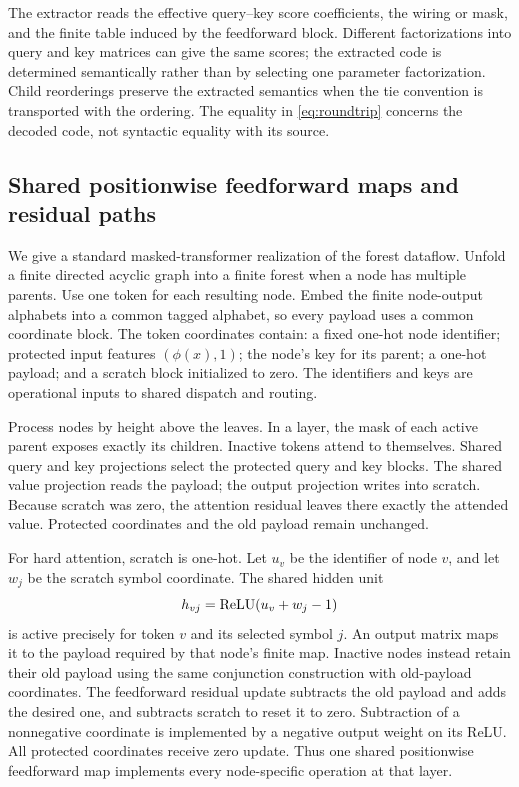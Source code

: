 The extractor reads the effective query--key score coefficients, the wiring or mask, and the finite table induced by the feedforward block. Different factorizations into query and key matrices can give the same scores; the extracted code is determined semantically rather than by selecting one parameter factorization. Child reorderings preserve the extracted semantics when the tie convention is transported with the ordering. The equality in \eqref{eq:roundtrip} concerns the decoded code, not syntactic equality with its source.

\subsection{Shared positionwise feedforward maps and residual paths}
We give a standard masked-transformer realization of the forest dataflow. Unfold a finite directed acyclic graph into a finite forest when a node has multiple parents. Use one token for each resulting node. Embed the finite node-output alphabets into a common tagged alphabet, so every payload uses a common coordinate block. The token coordinates contain: a fixed one-hot node identifier; protected input features $(\phi(x),1)$; the node's key for its parent; a one-hot payload; and a scratch block initialized to zero. The identifiers and keys are operational inputs to shared dispatch and routing.

Process nodes by height above the leaves. In a layer, the mask of each active parent exposes exactly its children. Inactive tokens attend to themselves. Shared query and key projections select the protected query and key blocks. The shared value projection reads the payload; the output projection writes into scratch. Because scratch was zero, the attention residual leaves there exactly the attended value. Protected coordinates and the old payload remain unchanged.

For hard attention, scratch is one-hot. Let $u_v$ be the identifier of node $v$, and let $w_j$ be the scratch symbol coordinate. The shared hidden unit
\[
 h_{vj}=\operatorname{ReLU}(u_v+w_j-1)
\]
is active precisely for token $v$ and its selected symbol $j$. An output matrix maps it to the payload required by that node's finite map. Inactive nodes instead retain their old payload using the same conjunction construction with old-payload coordinates. The feedforward residual update subtracts the old payload and adds the desired one, and subtracts scratch to reset it to zero. Subtraction of a nonnegative coordinate is implemented by a negative output weight on its ReLU. All protected coordinates receive zero update. Thus one shared positionwise feedforward map implements every node-specific operation at that layer.

